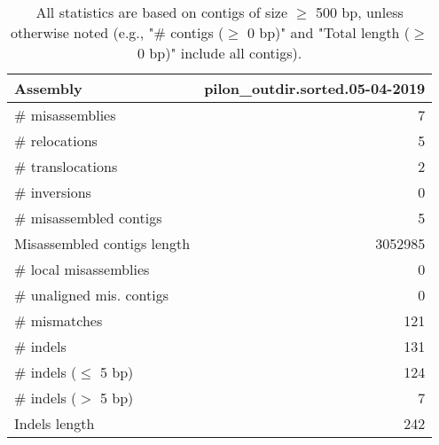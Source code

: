 \documentclass[12pt,a4paper]{article}
\begin{document}
\begin{table}[ht]
\begin{center}
\caption{All statistics are based on contigs of size $\geq$ 500 bp, unless otherwise noted (e.g., "\# contigs ($\geq$ 0 bp)" and "Total length ($\geq$ 0 bp)" include all contigs).}
\begin{tabular}{|l*{1}{|r}|}
\hline
Assembly & pilon\_outdir.sorted.05-04-2019 \\ \hline
\# misassemblies & 7 \\ \hline
\hspace{5mm}\# relocations & 5 \\ \hline
\hspace{5mm}\# translocations & 2 \\ \hline
\hspace{5mm}\# inversions & 0 \\ \hline
\# misassembled contigs & 5 \\ \hline
Misassembled contigs length & 3052985 \\ \hline
\# local misassemblies & 0 \\ \hline
\# unaligned mis. contigs & 0 \\ \hline
\# mismatches & 121 \\ \hline
\# indels & 131 \\ \hline
\hspace{5mm}\# indels ($\leq$ 5 bp) & 124 \\ \hline
\hspace{5mm}\# indels ($>$ 5 bp) & 7 \\ \hline
Indels length & 242 \\ \hline
\end{tabular}
\end{center}
\end{table}
\end{document}
